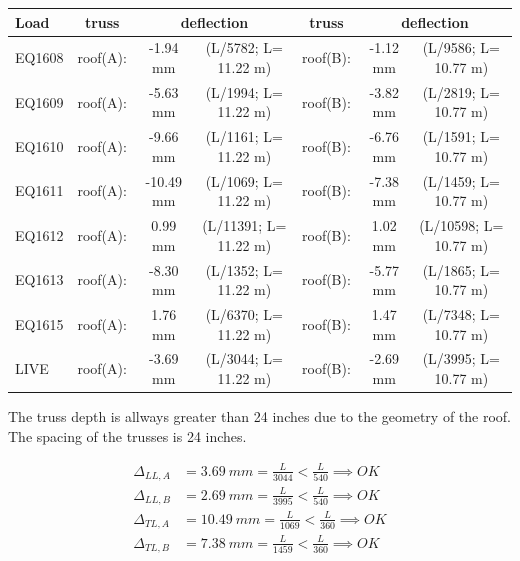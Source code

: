 \begin{center}
  \begin{scriptsize}
  \begin{tabular}{|l|c|c|c|c|c|c|}
    \hline
    \textbf{Load} & \textbf{truss} & \multicolumn{2}{c|}{\textbf{deflection}} & \textbf{truss} & \multicolumn{2}{c|}{\textbf{deflection}} \\
    \hline
EQ1608 & roof(A): & -1.94 mm & (L/5782; L= 11.22 m) & roof(B): &-1.12 mm & (L/9586; L= 10.77 m) \\
EQ1609 & roof(A): & -5.63 mm & (L/1994; L= 11.22 m) & roof(B): & -3.82 mm & (L/2819; L= 10.77 m) \\
EQ1610 & roof(A): & -9.66 mm & (L/1161; L= 11.22 m) & roof(B): & -6.76 mm & (L/1591; L= 10.77 m) \\
EQ1611 & roof(A): & -10.49 mm & (L/1069; L= 11.22 m) & roof(B): & -7.38 mm & (L/1459; L= 10.77 m) \\
EQ1612 & roof(A): & 0.99 mm & (L/11391; L= 11.22 m) & roof(B): & 1.02 mm & (L/10598; L= 10.77 m) \\
EQ1613 & roof(A): & -8.30 mm & (L/1352; L= 11.22 m) & roof(B): & -5.77 mm & (L/1865; L= 10.77 m) \\
EQ1615 & roof(A): & 1.76 mm & (L/6370; L= 11.22 m) & roof(B): & 1.47 mm & (L/7348; L= 10.77 m) \\
LIVE & roof(A): & -3.69 mm & (L/3044; L= 11.22 m) & roof(B): & -2.69 mm & (L/3995; L= 10.77 m) \\
\hline
  \end{tabular}
  \end{scriptsize}
\end{center}

\noindent The truss depth is allways greater than 24 inches due to the geometry of the roof. The spacing of the trusses is 24 inches.

\begin{align}
\Delta_{LL,A} &= 3.69\ mm= \frac{L}{3044} < \frac{L}{540} \implies OK \\
\Delta_{LL,B} &= 2.69\ mm= \frac{L}{3995} < \frac{L}{540} \implies OK \\
\Delta_{TL,A} &= 10.49\ mm= \frac{L}{1069} < \frac{L}{360} \implies OK \\
\Delta_{TL,B} &= 7.38\ mm= \frac{L}{1459} < \frac{L}{360} \implies OK
\end{align}

